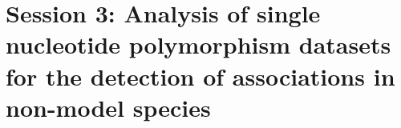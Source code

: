 
\section[Session 3]{Session 3: Analysis of single nucleotide polymorphism
datasets for the detection of associations in non-model species}

